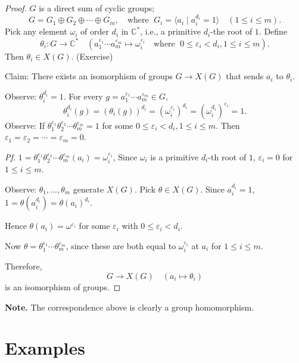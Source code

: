 \documentclass[
]{book}
\theoremstyle{definition}
\theoremstyle{definition}
\theoremstyle{definition}
\theoremstyle{definition}
\theoremstyle{remark}
\begin{document}
\begin{proof}
\(G\) is a direct sum of cyclic groups;
\[G = G_1\oplus G_2 \oplus \cdots \oplus G_m, \quad \textrm{where } \; G_i = \langle a_i\mid a_i^{d_i} = 1\rangle \quad (1\leq i\leq m).\]
Pick any element \(\omega_i\) of order \(d_i\) in \(\mathbb{C}^*\), i.e., a primitive \(d_i\)-the root of \(1\). Define
\[\theta_i: G \to \mathbb{C}^* \quad (a_1^{\varepsilon_1}\cdots a_m^{\varepsilon_m} \mapsto \omega_i^{\varepsilon_i} \quad \textrm{where }\; 0\leq \varepsilon_i < d_i, 1\leq i\leq m).\]
Then \(\theta_i\in X(G)\). (Exercise)

Claim: There exists an isomorphism of groups \(G \to X(G)\) that sends \(a_i\) to \(\theta_i\).

Observe: \(\theta_i^{d_i} = 1\). For every \(g = a_1^{\varepsilon_1}\cdots a_m^{\varepsilon_m} \in G\),
\[\theta_i^{d_i}(g) = (\theta_i(g))^{d_i} = (\omega_i^{\varepsilon_i})^{d_i} = (\omega_i^{d_i})^{\varepsilon_i} = 1.\]
Observe: If \(\theta_1^{\varepsilon_1}\theta_2^{\varepsilon_2}\cdots \theta_m^{\varepsilon_m} = 1\) for some \(0\leq \varepsilon_i < d_i, 1\leq i\leq m\). Then \(\varepsilon_1 = \varepsilon_2 = \cdots = \varepsilon_m = 0\).

\emph{Pf.} \(1 = \theta_1^{\varepsilon_1}\theta_2^{\varepsilon_2}\cdots \theta_m^{\varepsilon_m}(a_i) = \omega_i^{\varepsilon_i}\), Since \(\omega_i\) is a primitive \(d_i\)-th root of \(1\), \(\varepsilon_i = 0\) for \(1\leq i\leq m\).

Observe: \(\theta_1, \ldots, \theta_m\) generate \(X(G)\). Pick \(\theta\in X(G)\). Since
\(a_i^{d_i} = 1\), \(1 = \theta(a_i^{d_i}) = \theta(a_i)^{d_i}\).

Hence \(\theta(a_i) = \omega^{\varepsilon_i}\) for some \(\varepsilon_i\) with \(0\leq \varepsilon_i < d_i\).

Now \(\theta = \theta_1^{\varepsilon_1}\cdots \theta_m^{\varepsilon_m}\), since these are both equal to \(\omega_i^{\varepsilon_i}\) at \(a_i\) for \(1\leq i \leq m\).

Therefore,
\[G \to X(G) \quad (a_i \mapsto \theta_i)\]
is an isomorphism of groups.
\end{proof}

\textbf{Note.} The correspondence above is clearly a group homomorphism.

\hypertarget{lec4}{%
\chapter{Examples}\label{lec4}}
\end{document}
